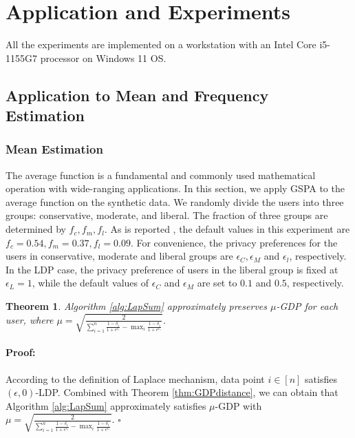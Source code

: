 \documentclass[letterpaper]{article} %
\newtheorem{theorem}{Theorem}
\newenvironment{proof}{\paragraph{Proof:}}{\hfill$\square$}
\begin{document}
\section{Application and Experiments}
All the experiments are implemented on a workstation with an Intel Core i5-1155G7 processor on Windows 11 OS.
\subsection{Application to Mean and Frequency Estimation}

\subsubsection{Mean Estimation}
The average function is a fundamental and commonly used mathematical operation with wide-ranging applications. In this section, we apply GSPA to  the average function on the synthetic data.
We randomly divide the users into three groups: conservative, moderate, and liberal. The fraction of three groups are determined by $f_c, f_m, f_l$.
As is reported \cite{Acquisti2005privacy}, the default values in this experiment are $f_c=0.54, f_m =0.37, f_l=0.09$. For convenience, the privacy preferences for the users in conservative,
moderate and liberal groups are $\epsilon_C, \epsilon_M$ and $\epsilon_l$, respectively. In the LDP case, the privacy preference of users in the liberal group is fixed at $\epsilon_L=1$, while the default values of $\epsilon_C$ and $\epsilon_M$ are set to $0.1$ and $0.5$, respectively. 
\begin{theorem}\label{coro:LapsumGDP}
Algorithm \ref{alg:LapSum} approximately preserves $\mu$-GDP for each user, where $
\mu = \sqrt{\frac{2}{\sum_{i=1}^{n} \frac{1-\delta_i}{1+e^{\epsilon_i}}-\max_{i}{\frac{1-\delta_{i}}{1+e^{\epsilon_{i}}}}}}.
$
\end{theorem}
\begin{proof}
According to the definition of Laplace mechanism, data point $i \in [n]$ satisfies $(\epsilon,0)$-LDP. Combined with
Theorem \ref{thm:GDPdistance}, we can obtain that Algorithm \ref{alg:LapSum} approximately satisfies $\mu$-GDP with $
\mu = \sqrt{\frac{2}{\sum_{i=1}^{n} \frac{1-\delta_i}{1+e^{\epsilon_i}}-\max_{i}{\frac{1-\delta_{i}}{1+e^{\epsilon_{i}}}}}}.
$
\end{proof}
\end{document}
